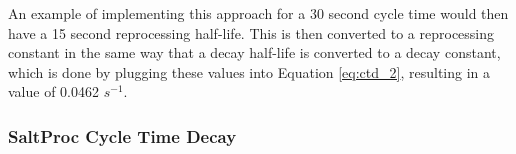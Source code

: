 


An example of implementing this approach for a 30 second cycle time would then have a 15 second reprocessing half-life. This is then converted to a reprocessing constant in the same way that a decay half-life is converted to a decay constant, which is done by plugging these values into Equation \eqref{eq:ctd_2}, resulting in a value of 0.0462 $s^{-1}$.


\subsubsection{SaltProc Cycle Time Decay}

